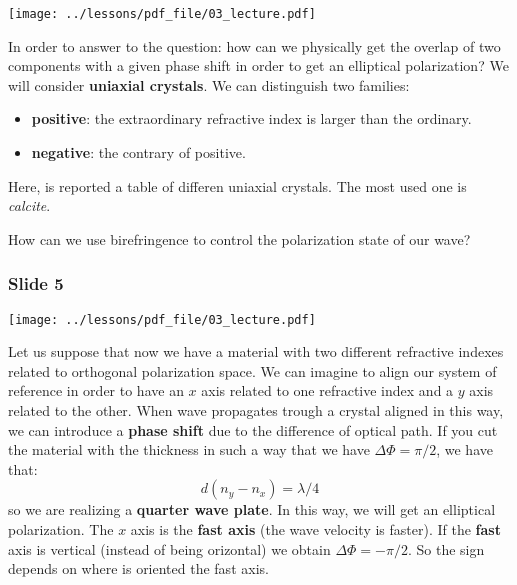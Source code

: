 \documentclass[../main/main.tex]{subfiles}
\begin{document}
\begin{minipage}[]{0.5\linewidth}
\centering
\texttt{[image: ../lessons/pdf\_file/03\_lecture.pdf]}
\end{minipage}
\hspace{0.3cm}\vspace{0.3cm}
\begin{minipage}[c]{0.47\linewidth}

In order to answer to the question: how can we physically get the overlap of two components with a given phase shift in order to get an elliptical polarization?
We will consider \textbf{uniaxial crystals}. We can distinguish two families:
\begin{itemize}
\item \textbf{positive}: the extraordinary refractive index is larger than the ordinary.

\item \textbf{negative}: the contrary of positive.

\end{itemize}

Here, is reported a table of differen uniaxial crystals. The most used one is \emph{calcite}.

How can we use birefringence to control the polarization state of our wave?

\end{minipage}

\subsubsection*{Slide 5}

\begin{minipage}[]{0.5\linewidth}
\centering
\texttt{[image: ../lessons/pdf\_file/03\_lecture.pdf]}
\end{minipage}
\hspace{0.3cm}\vspace{0.3cm}
\begin{minipage}[c]{0.47\linewidth}

Let us suppose that now we have a material with two different refractive indexes related to orthogonal polarization space. We can imagine to align our system of reference in order to have an \( x \) axis related to one refractive index and a \( y \) axis related to the other. When wave propagates trough a crystal aligned in this way, we can introduce a \textbf{phase shift} due to the difference of optical path. If you cut the material with the thickness in such a way that we have \( \Delta \Phi = \pi /2 \), we have that:
\begin{equation*}
  d (n_y - n_x) = \lambda /4
\end{equation*}
so we are realizing a \textbf{quarter wave plate}.
In this way, we will get an elliptical polarization. The \( x \) axis is the \textbf{fast axis} (the wave velocity is faster).
If the \textbf{fast} axis is vertical (instead of being orizontal) we obtain \( \Delta \Phi = - \pi /2 \). So the sign depends on where is oriented the fast axis.

\end{minipage}
\end{document}
